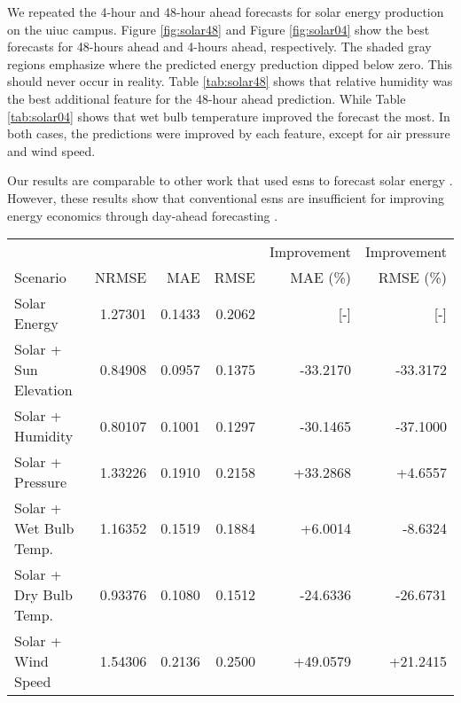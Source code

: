We repeated the 4-hour and 48-hour ahead forecasts for solar energy production
on the \gls{uiuc} campus. Figure \ref{fig:solar48} and Figure \ref{fig:solar04}
show the best forecasts for 48-hours ahead and 4-hours ahead, respectively. The
shaded gray regions emphasize where the predicted energy preduction dipped
below zero. This should never occur in reality. Table \ref{tab:solar48} shows
that relative humidity was the best additional feature for the 48-hour ahead
prediction. While Table \ref{tab:solar04} shows that wet bulb temperature
improved the forecast the most. In both cases, the predictions were improved
by each feature, except for air pressure and wind speed.

Our results are comparable to other work that used \glspl{esn} to forecast
solar energy \cite{li_echo_2019}.
However, these results show that conventional \glspl{esn} are insufficient for
improving energy economics through day-ahead forecasting
\cite{brancucci_martinez-anido_value_2016}.

\begin{figure*}[h]
  \centering
  
  \caption{The optimized 48-hour ahead solar energy prediction. The inputs for this forecast were solar energy and relative humidity. : Reservoir Size:800, Sparsity: 0.2, Spectral Radius: 1.5, Noise: 0.0001, Training Length: 5000, Prediction Window: 48, Random state: 85}
  \label{fig:solar48}
\end{figure*}
  \begin{table*}[h]
    \centering
    \caption{Tabulated error for 48-hour ahead solar energy forecasts with various coupled quantities. Improvement indicates the percentage improvement over the base case of forecasting solar energy alone.}
    \label{tab:solar48}
    \begin{tabular}{l|r|r|r|r|r}
      & & & & Improvement & Improvement \\
      Scenario &NRMSE & MAE & RMSE & MAE (\%) & RMSE (\%)\\
      \hline
      Solar Energy & 1.27301 & 0.1433 &0.2062 & [-] & [-] \\
      Solar + Sun Elevation & 0.84908 & 0.0957 & 0.1375 &  -33.2170 & -33.3172 \\
      Solar + Humidity & 0.80107 & 0.1001 & 0.1297 & -30.1465 & -37.1000 \\
      Solar + Pressure & 1.33226 & 0.1910 & 0.2158 & +33.2868 & +4.6557 \\
      Solar + Wet Bulb Temp. & 1.16352 & 0.1519 & 0.1884 & +6.0014 & -8.6324 \\
      Solar + Dry Bulb Temp. & 0.93376 & 0.1080 & 0.1512 & -24.6336 & -26.6731 \\
      Solar + Wind Speed & 1.54306 & 0.2136 & 0.2500 & +49.0579 & +21.2415 \\
    \end{tabular}
  \end{table*}
